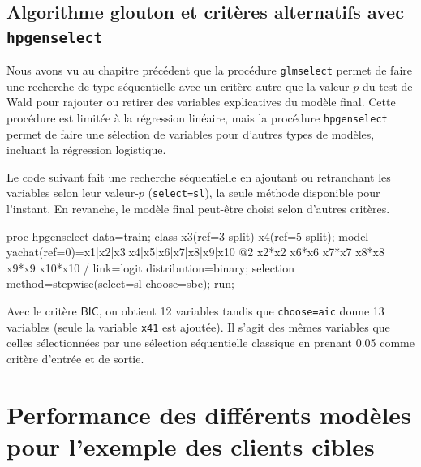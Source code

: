 \documentclass[
  11pt,
  letterpaper,
]{book}
\newenvironment{Shaded}{\begin{snugshade}}{\end{snugshade}}
\newcommand{\NormalTok}[1]{#1}
\theoremstyle{definition}
\theoremstyle{definition}
\theoremstyle{definition}
\theoremstyle{definition}
\theoremstyle{remark}
\begin{document}
\hypertarget{algorithme-glouton-et-crituxe8res-alternatifs-avec-hpgenselect}{%
\subsection{\texorpdfstring{Algorithme glouton et critères alternatifs avec \texttt{hpgenselect}}{Algorithme glouton et critères alternatifs avec hpgenselect}}\label{algorithme-glouton-et-crituxe8res-alternatifs-avec-hpgenselect}}

Nous avons vu au chapitre précédent que la procédure \texttt{glmselect} permet de faire une recherche de type séquentielle avec un critère autre que la valeur-\(p\) du test de Wald pour rajouter ou retirer des variables explicatives du modèle final. Cette procédure est limitée à la régression linéaire, mais la procédure \texttt{hpgenselect} permet de faire une sélection de variables pour d'autres types de modèles, incluant la régression logistique.

Le code suivant fait une recherche séquentielle en ajoutant ou retranchant les variables selon leur valeur-\(p\) (\texttt{select=sl}), la seule méthode disponible pour l'instant. En revanche, le modèle final peut-être choisi selon d'autres critères.

\begin{Shaded}
\begin{Highlighting}[]
\NormalTok{proc hpgenselect data=train;}
\NormalTok{class x3(ref=\textquotesingle{}3\textquotesingle{} split) x4(ref=\textquotesingle{}5\textquotesingle{} split);}
\NormalTok{model yachat(ref=\textquotesingle{}0\textquotesingle{})=x1|x2|x3|x4|x5|x6|x7|x8|x9|x10 @2 }
\NormalTok{ x2*x2 x6*x6 x7*x7 x8*x8 x9*x9 x10*x10 /  }
\NormalTok{link=logit distribution=binary;}
\NormalTok{selection method=stepwise(select=sl choose=sbc);}
\NormalTok{run;}
\end{Highlighting}
\end{Shaded}

Avec le critère \(\mathsf{BIC}\), on obtient 12 variables tandis que \texttt{choose=aic} donne 13 variables (seule la variable \texttt{x41} est ajoutée). Il s'agit des mêmes variables que celles sélectionnées par une sélection séquentielle classique en prenant 0.05 comme critère d'entrée et de sortie.

\hypertarget{performance-des-diffuxe9rents-moduxe8les-pour-lexemple-des-clients-cibles}{%
\section{Performance des différents modèles pour l'exemple des clients cibles}\label{performance-des-diffuxe9rents-moduxe8les-pour-lexemple-des-clients-cibles}}
\end{document}
